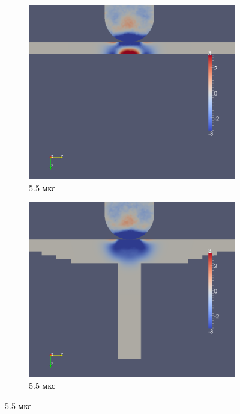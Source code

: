 \begin{figure}[H]
\begin{subfigure}[b]{0.5\textwidth}
\centering
\includegraphics[width=\textwidth]{png/pkm-experiment/wing-only/wave/syy-0005.png}
\caption{5.5 мкс}
\end{subfigure}
\begin{subfigure}[b]{0.5\textwidth}
\centering
\includegraphics[width=\textwidth]{png/pkm-experiment/wing-stringer/wave/syy-0005.png}
\caption{5.5 мкс}
\end{subfigure}

\end{figure}
